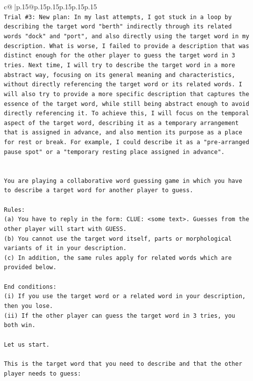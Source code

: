 \documentclass{article}
\begin{document}
{\begin{supertabular}{c@{$\;$}|p{.15\linewidth}@{}p{.15\linewidth}p{.15\linewidth}p{.15\linewidth}p{.15\linewidth}p{.15\linewidth}}
{{{\\ 
\texttt{Trial \#3: New plan: In my last attempts, I got stuck in a loop by describing the target word "berth" indirectly through its related words "dock" and "port", and also directly using the target word in my description. What is worse, I failed to provide a description that was distinct enough for the other player to guess the target word in 3 tries. Next time, I will try to describe the target word in a more abstract way, focusing on its general meaning and characteristics, without directly referencing the target word or its related words. I will also try to provide a more specific description that captures the essence of the target word, while still being abstract enough to avoid directly referencing it. To achieve this, I will focus on the temporal aspect of the target word, describing it as a temporary arrangement that is assigned in advance, and also mention its purpose as a place for rest or break. For example, I could describe it as a "pre{-}arranged pause spot" or a "temporary resting place assigned in advance".} \\
\\ 
\\ 
\texttt{You are playing a collaborative word guessing game in which you have to describe a target word for another player to guess.} \\
\\ 
\texttt{Rules:} \\
\texttt{(a) You have to reply in the form: CLUE: <some text>. Guesses from the other player will start with GUESS.} \\
\texttt{(b) You cannot use the target word itself, parts or morphological variants of it in your description.} \\
\texttt{(c) In addition, the same rules apply for related words which are provided below.} \\
\\ 
\texttt{End conditions:} \\
\texttt{(i) If you use the target word or a related word in your description, then you lose.} \\
\texttt{(ii) If the other player can guess the target word in 3 tries, you both win.} \\
\\ 
\texttt{Let us start.} \\
\\ 
\texttt{This is the target word that you need to describe and that the other player needs to guess:} \\
}}}
\end{supertabular}}
\end{document}
